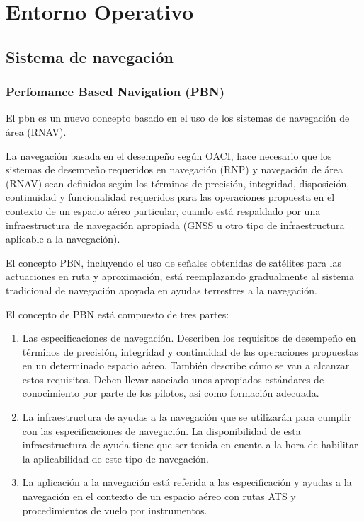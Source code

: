 \section{Entorno Operativo}

\subsection{Sistema de navegación}

\subsubsection{Perfomance Based Navigation (PBN)}

El \acrfull{pbn} es un nuevo concepto basado en el uso de los sistemas de navegación de área (RNAV). 

La navegación basada en el desempeño según OACI, hace necesario que los sistemas de desempeño requeridos en navegación (RNP) y navegación de área (RNAV) sean definidos según los términos de precisión, integridad, disposición, continuidad y funcionalidad requeridos para las operaciones propuesta en el contexto de un espacio aéreo particular, cuando está respaldado por una infraestructura de navegación apropiada (GNSS u otro tipo de infraestructura aplicable a la navegación).

El concepto PBN, incluyendo el uso de señales obtenidas de satélites para las actuaciones en ruta y aproximación, está reemplazando gradualmente al sistema tradicional de navegación apoyada en ayudas terrestres a la navegación.

El concepto de PBN está compuesto de tres partes:

\begin{enumerate}
    \item Las especificaciones de navegación. Describen los requisitos de desempeño en términos de precisión, integridad y continuidad de las operaciones propuestas en un determinado espacio aéreo. También describe cómo se van a alcanzar estos requisitos. Deben llevar asociado unos apropiados estándares de conocimiento por parte de los pilotos, así como formación adecuada.
    
    \item La infraestructura de ayudas a la navegación que se utilizarán para cumplir con las especificaciones de navegación. La disponibilidad de esta infraestructura de ayuda tiene que ser tenida en cuenta a la hora de habilitar la aplicabilidad de este tipo de navegación.
    
    \item La aplicación a la navegación está referida a las especificación y ayudas a la navegación en el contexto de un espacio aéreo con rutas ATS y procedimientos de vuelo por instrumentos.
\end{enumerate}

